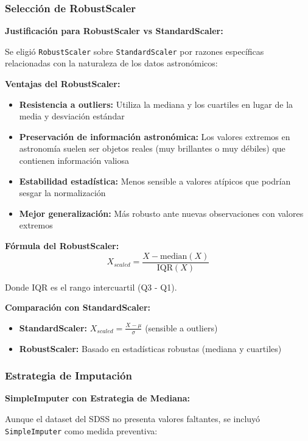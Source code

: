 \documentclass{article}
\begin{document}
\subsubsection{Selección de RobustScaler}

\textbf{Justificación para RobustScaler vs StandardScaler:}

Se eligió \texttt{RobustScaler} \cite{sklearn_robustscaler} sobre \texttt{StandardScaler} por razones específicas relacionadas con la naturaleza de los datos astronómicos:

\textbf{Ventajas del RobustScaler:}
\begin{itemize}
    \item \textbf{Resistencia a outliers:} Utiliza la mediana y los cuartiles en lugar de la media y desviación estándar
    \item \textbf{Preservación de información astronómica:} Los valores extremos en astronomía suelen ser objetos reales (muy brillantes o muy débiles) que contienen información valiosa
    \item \textbf{Estabilidad estadística:} Menos sensible a valores atípicos que podrían sesgar la normalización
    \item \textbf{Mejor generalización:} Más robusto ante nuevas observaciones con valores extremos
\end{itemize}

\textbf{Fórmula del RobustScaler:}
\begin{equation}
X_{scaled} = \frac{X - \text{median}(X)}{\text{IQR}(X)}
\end{equation}

Donde IQR es el rango intercuartil (Q3 - Q1).

\textbf{Comparación con StandardScaler:}
\begin{itemize}
    \item \textbf{StandardScaler:} $X_{scaled} = \frac{X - \mu}{\sigma}$ (sensible a outliers)
    \item \textbf{RobustScaler:} Basado en estadísticas robustas (mediana y cuartiles)
\end{itemize}

\subsubsection{Estrategia de Imputación}

\textbf{SimpleImputer con Estrategia de Mediana:}

Aunque el dataset del SDSS no presenta valores faltantes, se incluyó \texttt{SimpleImputer} \cite{sklearn_simpleimputer} como medida preventiva:
\end{document}
